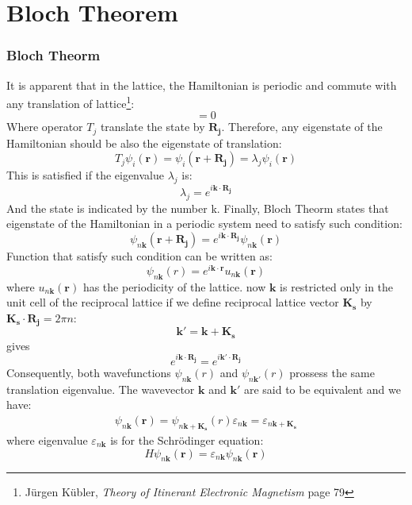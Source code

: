\documentclass{article}
\newcommand{\bm}[1]{\mathbf{#1}}
\begin{document}
\part{Bloch Theorem}

\section{Bloch Theorm}
It is apparent that in the lattice, the Hamiltonian is periodic and commute with any 
translation of lattice\footnote{ J\"{u}rgen K\"{u}bler, \emph{Theory of Itinerant Electronic Magnetism} page 79}:
\begin{equation}
    [T_j,H]=0
\end{equation}
Where operator $T_j$ translate the state by $\bm{R_j}$. Therefore, any eigenstate of the Hamiltonian should be also the eigenstate of translation:
\begin{equation}
    T_j \psi_i(\bm{r})=\psi_i(\bm{r}+\bm{R_j})=\lambda_j \psi_i(\bm{r})
\end{equation}
This is satisfied if the eigenvalue $\lambda_j$ is:
\begin{equation}
    \lambda_j=e^{i\bm{k} \cdot \bm{R_j}}
\end{equation}
And the state is indicated by the number k.
Finally, Bloch Theorm states that eigenstate of the Hamiltonian in a periodic system need to satisfy such condition:
\begin{equation}
    \psi_{n\bm{k}}(\bm{r} + \bm{R_j})=e^{i\bm{k} \cdot \bm{R_j}} \psi_{n\bm{k}}(\bm{r})
\end{equation}
Function that satisfy such condition can be written as:
\begin{equation}
    \psi_{n\bm{k}}(r)=e^{i\bm{k} \cdot \bm{r}} u_{n\bm{k}}(\bm{r})
\end{equation}
where $u_{n\bm{k}}(\bm{r})$ has the periodicity of the lattice.
now $\bm{k}$ is restricted only in the unit cell of the reciprocal lattice 
if we define reciprocal lattice vector $\bm{K_s}$ by $\bm{K_s} \cdot \bm{R_j} = 2\pi n $: 
\begin{equation}
    \bm{k'}=\bm{k}+\bm{K_s}
\end{equation}
gives
\begin{equation}
    e^{i\bm{k} \cdot \bm{R_j}} = e^{i\bm{k'} \cdot \bm{R_j}} 
\end{equation}
Consequently, both wavefunctions $\psi_{n\bm{k}}(r)$ and $\psi_{n\bm{k'}}(r)$ prossess the same translation eigenvalue. 
The wavevector $\bm{k}$ and $\bm{k'}$ are said to be equivalent and we have:
\begin{align}
    \psi_{n\bm{k}}(\bm{r}) = \psi_{n\bm{k}+\bm{K_s}}(r)
    \varepsilon_{n\bm{k}}  = \varepsilon_{n\bm{k}+\bm{K_s}}
\end{align}
where eigenvalue $\varepsilon_{n\bm{k}}$ is for the Schr\"{o}dinger equation:
\begin{equation}
    H \psi_{n\bm{k}}(\bm{r}) = \varepsilon_{n\bm{k}} \psi_{n\bm{k}}(\bm{r})
\end{equation}
\end{document}
